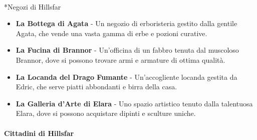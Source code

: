 \documentclass{article}
\begin{document}
                  \paragraph{}*{Negozi di Hillsfar}

\begin{itemize}
  \item \textbf{La Bottega di Agata} - Un negozio di erboristeria gestito dalla gentile Agata, che vende una vasta gamma di erbe e pozioni curative.
  \item \textbf{La Fucina di Brannor} - Un'officina di un fabbro tenuta dal muscoloso Brannor, dove si possono trovare armi e armature di ottima qualità.
  \item \textbf{La Locanda del Drago Fumante} - Un'accogliente locanda gestita da Edric, che serve piatti abbondanti e birra della casa.
  \item \textbf{La Galleria d'Arte di Elara} - Uno spazio artistico tenuto dalla talentuosa Elara, dove si possono acquistare dipinti e sculture uniche.
\end{itemize}

                  \paragraph*{Cittadini di Hillsfar}
\end{document}
